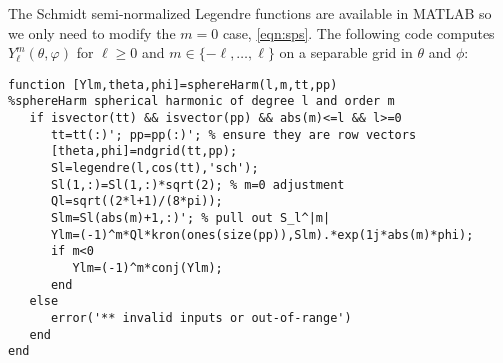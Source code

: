 \documentclass[a4paper,10pt]{article}
\begin{document}
The Schmidt semi-normalized Legendre functions are available in MATLAB so we only need to modify the $m=0$ case, \eqref{eqn:sps}.  The following code computes $Y_{\ell}^{m}(\theta,\varphi)$ for $\ell\geq0$ and $m\in\{-\ell,\dotsc,\ell\}$ on a separable grid in $\theta$ and $\phi$:
\color{blue}
\begin{verbatim}
function [Ylm,theta,phi]=sphereHarm(l,m,tt,pp)
%sphereHarm spherical harmonic of degree l and order m
   if isvector(tt) && isvector(pp) && abs(m)<=l && l>=0
      tt=tt(:)'; pp=pp(:)'; % ensure they are row vectors
      [theta,phi]=ndgrid(tt,pp);
      Sl=legendre(l,cos(tt),'sch');
      Sl(1,:)=Sl(1,:)*sqrt(2); % m=0 adjustment
      Ql=sqrt((2*l+1)/(8*pi));
      Slm=Sl(abs(m)+1,:)'; % pull out S_l^|m|
      Ylm=(-1)^m*Ql*kron(ones(size(pp)),Slm).*exp(1j*abs(m)*phi);
      if m<0
         Ylm=(-1)^m*conj(Ylm);
      end
   else
      error('** invalid inputs or out-of-range')
   end
end\end{verbatim}
\color{black}
\end{document}
